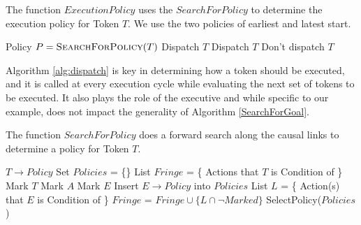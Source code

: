 
\begin{algorithm} [H]
  \caption{\small The function $ExecutionPolicy$ uses the
    $SearchForPolicy$ to determine the execution policy for Token
    $T$. We use the two policies of earliest and latest start.}
  \label{alg:dispatch}
\label{ExecutionPolicy}
\begin{algorithmic}
\small 
{}
\State Policy $P = \textsc{SearchForPolicy}( T )$
	\State \Return Dispatch $T$
	\State \Return Dispatch $T$
\Else
	\State \Return Don't dispatch $T$
\EndIf
\EndFunction
\end{algorithmic}
\end{algorithm}

Algorithm \ref{alg:dispatch} is key in determining how a token should
be executed, and it is called at every execution cycle while
evaluating the next set of tokens to be executed. It also plays the
role of the executive and while specific to our example, does not
impact the generality of Algorithm \ref{SearchForGoal}.


\begin{algorithm} [htb]
  \caption{\small The function $SearchForPolicy$ does a forward search
    along the causal links to determine a policy for Token $T$.}
  \label{SearchForGoal}
\begin{algorithmic}
  \small
  \State \Return $T \to Policy$
  \Else 
  \State Set $Policies$ = \{\}
  \State List $Fringe$ = \{ Actions that $T$ is Condition of \}
  \State Mark $T$
  \State Mark $A$
  \State Mark $E$
  \State Insert $E \to Policy$ into $Policies$
  \EndIf
  \State List $L$ = \{ Action(s) that $E$ is Condition of \}
  \State $Fringe$ = $Fringe \cup \{L \cap \neg Marked \}$ 
  \EndFor
  \EndFor
  \EndIf
  \State \Return SelectPolicy($Policies$)
\EndFunction
\end{algorithmic}
\end{algorithm}


